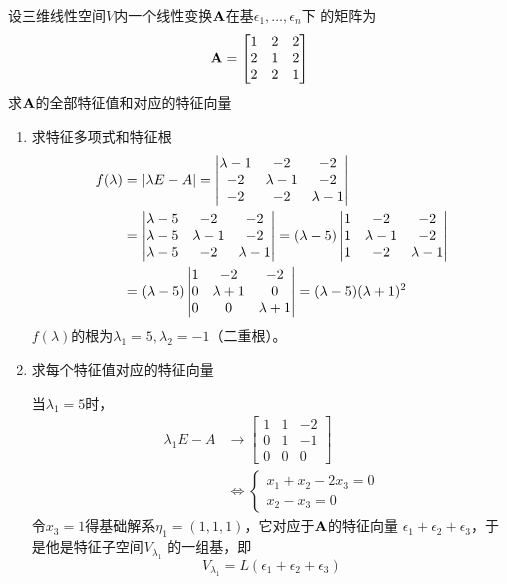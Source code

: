 \documentclass[11pt]{article}
\begin{document}
\begin{examplle}[]
设三维线性空间\(V\)内一个线性变换\(\operatorname{\textbf{A}}\)在基\(\epsilon_1,\dots,\epsilon_n\)下
的矩阵为
\begin{equation*}
\operatorname{\textbf{A}}=
\begin{bmatrix}
1&2&2\\2&1&2\\2&2&1
\end{bmatrix}
\end{equation*}
求\(\operatorname{\textbf{A}}\)的全部特征值和对应的特征向量

\begin{enumerate}
\item 求特征多项式和特征根
\begin{align*}
f(\lambda)&=\abs{\lambda E-A}=
\begin{vmatrix}
\lambda-1&-2&-2\\
-2&\lambda-1&-2\\
-2&-2&\lambda-1
\end{vmatrix}\\
&=\begin{vmatrix}
\lambda-5&-2&-2\\
\lambda-5&\lambda-1&-2\\
\lambda-5&-2&\lambda-1
\end{vmatrix}=(\lambda-5)
\begin{vmatrix}
1&-2&-2\\
1&\lambda-1&-2\\
1&-2&\lambda-1
\end{vmatrix}\\
&=(\lambda-5)
\begin{vmatrix}
1&-2&-2\\
0&\lambda+1&0\\
0&0&\lambda+1
\end{vmatrix}=
(\lambda-5)(\lambda+1)^2
\end{align*}
\(f(\lambda)\)的根为\(\lambda_1=5,\lambda_2=-1\)（二重根）。
\item 求每个特征值对应的特征向量

当\(\lambda_1=5\)时，
\begin{align*}
\lambda_1 E-A&\to
\begin{bmatrix}
1&1&-2\\
0&1&-1\\
0&0&0
\end{bmatrix}\\
&\Leftrightarrow
\begin{cases}
x_1+x_2-2x_3=0\\
x_2-x_3=0
\end{cases}
\end{align*}
令\(x_3=1\)得基础解系\(\eta_1=(1,1,1)\)，它对应于\(\operatorname{\textbf{A}}\)的特征向量
\(\epsilon_1+\epsilon_2+\epsilon_3\)，于是他是特征子空间\(V_{\lambda_1}\)
的一组基，即
\begin{equation*}
V_{\lambda_1}=L(\epsilon_1+\epsilon_2+\epsilon_3)
\end{equation*}


\end{enumerate}
\end{examplle}
\end{document}
